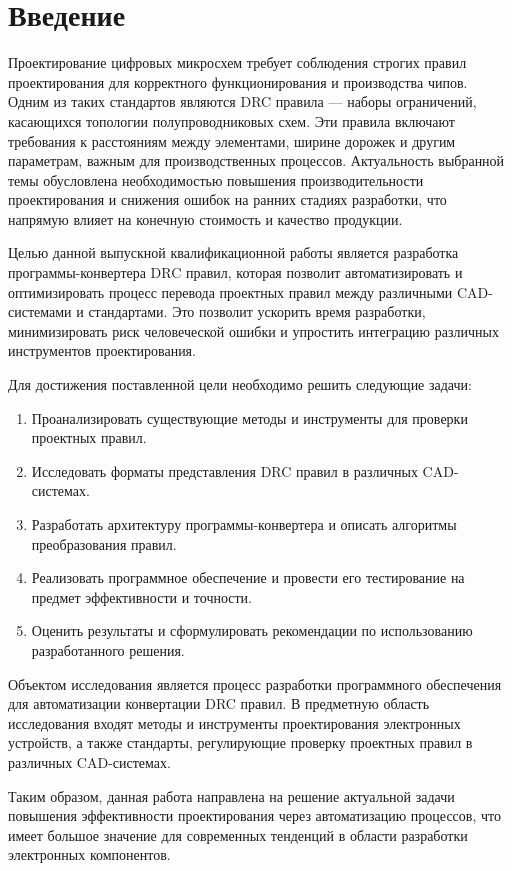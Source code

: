 \chapter*{Введение}

Проектирование цифровых микросхем требует соблюдения строгих правил
проектирования для корректного функционирования и производства чипов.
Одним из таких стандартов являются DRC правила --- наборы ограничений,
касающихся топологии полупроводниковых схем.
Эти правила включают требования к расстояниям между элементами,
ширине дорожек и другим параметрам, важным для производственных процессов.
Актуальность выбранной темы обусловлена необходимостью повышения
производительности проектирования
и снижения ошибок на ранних стадиях разработки,
что напрямую влияет на конечную стоимость и качество продукции.

Целью данной выпускной квалификационной работы является разработка
программы-конвертера DRC правил, которая позволит автоматизировать
и оптимизировать процесс перевода проектных правил между различными
CAD-системами и стандартами.
Это позволит ускорить время разработки,
минимизировать риск человеческой ошибки
и упростить интеграцию различных инструментов проектирования.

Для достижения поставленной цели необходимо решить следующие задачи:

\begin{enumerate}
	\item Проанализировать существующие методы
		и инструменты для проверки проектных правил.
	\item Исследовать форматы представления DRC правил
		в различных CAD-системах.
	\item Разработать архитектуру программы-конвертера
		и описать алгоритмы преобразования правил.
	\item Реализовать программное обеспечение
		и провести его тестирование на предмет эффективности и точности.
	\item Оценить результаты и сформулировать рекомендации
		по использованию разработанного решения.
\end{enumerate}

Объектом исследования является процесс разработки программного обеспечения
для автоматизации конвертации DRC правил.
В предметную область исследования входят методы
и инструменты проектирования электронных устройств, а также стандарты,
регулирующие проверку проектных правил в различных CAD-системах.

Таким образом, данная работа направлена
на решение актуальной задачи повышения эффективности проектирования
через автоматизацию процессов, что имеет большое значение
для современных тенденций в области разработки электронных компонентов.

